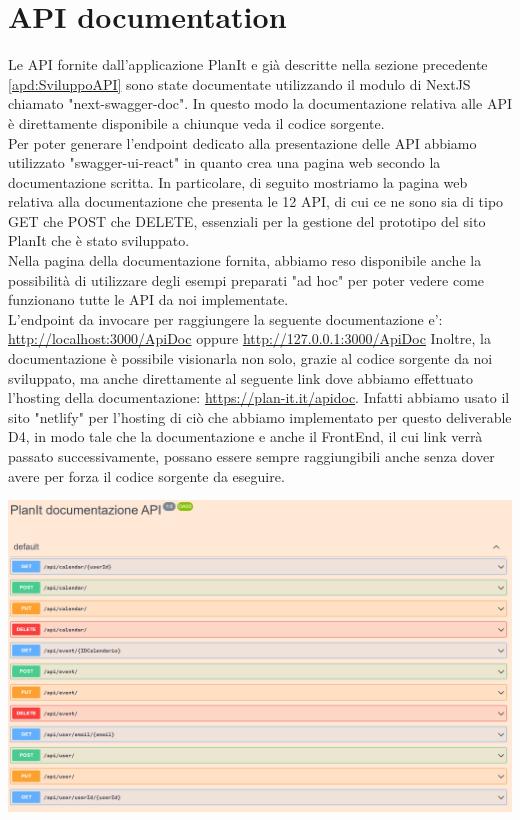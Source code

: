 \section{API documentation}
\label{secD4:APIDocumentation}
Le API fornite dall’applicazione PlanIt e già descritte nella sezione precedente \ref{apd:SviluppoAPI} sono
state documentate utilizzando il modulo di NextJS chiamato "next-swagger-doc". In questo
modo la documentazione relativa alle API è direttamente disponibile a chiunque veda il codice
sorgente.\\
Per poter generare l’endpoint dedicato alla presentazione delle API abbiamo utilizzato "swagger-ui-react" in quanto crea una pagina web secondo la documentazione scritta.
In particolare, di seguito mostriamo la pagina web relativa alla documentazione che presenta le 12 API, di cui ce ne sono sia di tipo GET che POST che DELETE, essenziali per la gestione del prototipo del sito PlanIt che è stato sviluppato.\\
Nella pagina della documentazione fornita, abbiamo reso disponibile anche la possibilità di utilizzare degli esempi preparati "ad hoc" per poter vedere come funzionano tutte le API da noi implementate. \\
L’endpoint da invocare per raggiungere la seguente documentazione e’:
\href{http://localhost:3000/ApiDoc}{http://localhost:3000/ApiDoc} oppure \href{http://127.0.0.1:3000/ApiDoc}{http://127.0.0.1:3000/ApiDoc}
Inoltre, la documentazione è possibile visionarla non solo, grazie al codice sorgente da noi sviluppato, ma anche direttamente al seguente link dove abbiamo effettuato l'hosting della documentazione: \href{https://plan-it.it/apidoc}{https://plan-it.it/apidoc}. Infatti abbiamo usato il sito "netlify" per l'hosting di ciò che abbiamo implementato per questo deliverable D4, in modo tale che la documentazione e anche il FrontEnd, il cui link verrà passato successivamente, possano essere sempre raggiungibili anche senza dover avere per forza il codice sorgente da eseguire.
\begin{center}
    \includegraphics[width=1\textwidth, height=0.4\textheight]{img/png/documentazione.png}
\end{center}